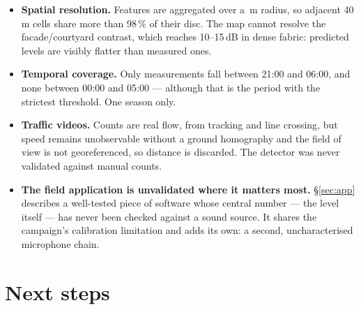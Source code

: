 \documentclass[11pt,a4paper]{article}
\newcommand{\dB}{\ensuremath{\,\mathrm{dB}}}
\begin{document}
\begin{itemize}
  \item \textbf{Spatial resolution.} Features are aggregated over a \bufferM\,m
        radius, so adjacent 40\,m cells share more than 98\,\% of their disc. The
        map cannot resolve the facade/courtyard contrast, which reaches
        10--15\dB{} in dense fabric: predicted levels are visibly flatter than
        measured ones.

  \item \textbf{Temporal coverage.} Only \nNight{} measurements fall between
        21:00 and 06:00, and none between 00:00 and 05:00 --- although that is
        the period with the strictest threshold. One season only.

  \item \textbf{Traffic videos.} Counts are real flow, from tracking and line
        crossing, but speed remains unobservable without a ground homography and
        the field of view is not georeferenced, so distance is discarded. The
        detector was never validated against manual counts.

  \item \textbf{The field application is unvalidated where it matters most.}
        \S\ref{sec:app} describes a well-tested piece of software whose central
        number --- the level itself --- has never been checked against a sound
        source. It shares the campaign's calibration limitation and adds its own:
        a second, uncharacterised microphone chain.
\end{itemize}

\section{Next steps}
\end{document}
